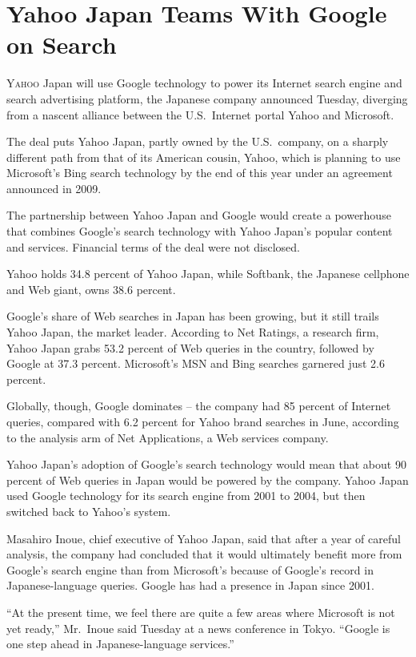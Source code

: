 ﻿\documentclass[12pt]{article}
\begin{document}
\section{Yahoo Japan Teams With Google on Search}

\lettrine{Y}{ahoo} Japan will use Google technology to power its Internet
search engine and search advertising platform, the Japanese company announced Tuesday, diverging
from a nascent alliance between the U.S.~Internet portal Yahoo and Microsoft.

The deal puts Yahoo Japan, partly owned by the U.S.~company, on a sharply different path from that
of its American cousin, Yahoo, which is planning to use Microsoft's Bing search technology by the
end of this year under an agreement announced in 2009.

The partnership between Yahoo Japan and Google would create a powerhouse that combines Google's
search technology with Yahoo Japan's popular content and services. Financial terms of the deal were
not disclosed.

Yahoo holds 34.8 percent of Yahoo Japan, while Softbank, the Japanese cellphone and Web giant, owns
38.6 percent.

Google's share of Web searches in Japan has been growing, but it still trails Yahoo Japan, the
market leader. According to Net Ratings, a research firm, Yahoo Japan grabs 53.2 percent of Web
queries in the country, followed by Google at 37.3 percent. Microsoft's MSN and Bing searches
garnered just 2.6 percent.

Globally, though, Google dominates -- the company had 85 percent of Internet queries, compared with
6.2 percent for Yahoo brand searches in June, according to the analysis arm of Net Applications, a
Web services company.

Yahoo Japan's adoption of Google's search technology would mean that about 90 percent of Web queries
in Japan would be powered by the company. Yahoo Japan used Google technology for its search engine
from 2001 to 2004, but then switched back to Yahoo's system.

Masahiro Inoue, chief executive of Yahoo Japan, said that after a year of careful analysis, the
company had concluded that it would ultimately benefit more from Google's search engine than from
Microsoft's because of Google's record in Japanese-language queries. Google has had a presence in
Japan since 2001.

``At the present time, we feel there are quite a few areas where Microsoft is not yet ready,''
Mr.~Inoue said Tuesday at a news conference in Tokyo. ``Google is one step ahead in
Japanese-language services.''
\end{document}
